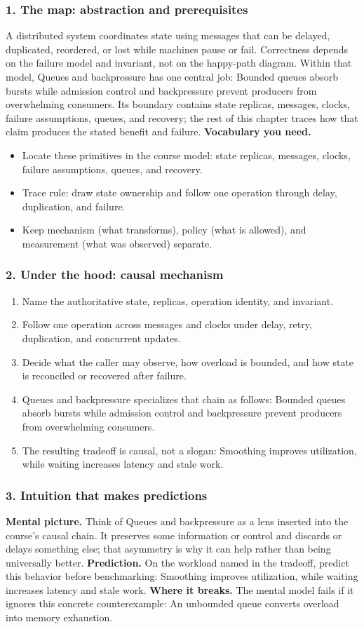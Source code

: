 \subsubsection*{1. The map: abstraction and prerequisites}
A distributed system coordinates state using messages that can be delayed, duplicated, reordered, or lost while machines pause or fail. Correctness depends on the failure model and invariant, not on the happy-path diagram.
Within that model, Queues and backpressure has one central job: Bounded queues absorb bursts while admission control and backpressure prevent producers from overwhelming consumers. Its boundary contains state replicas, messages, clocks, failure assumptions, queues, and recovery; the rest of this chapter traces how that claim produces the stated benefit and failure.
\textbf{Vocabulary you need.}\begin{itemize}
\item Locate these primitives in the course model: state replicas, messages, clocks, failure assumptions, queues, and recovery.
\item Trace rule: draw state ownership and follow one operation through delay, duplication, and failure.
\item Keep mechanism (what transforms), policy (what is allowed), and measurement (what was observed) separate.
\end{itemize}
\subsubsection*{2. Under the hood: causal mechanism}\begin{enumerate}
\item Name the authoritative state, replicas, operation identity, and invariant.
\item Follow one operation across messages and clocks under delay, retry, duplication, and concurrent updates.
\item Decide what the caller may observe, how overload is bounded, and how state is reconciled or recovered after failure.
\item Queues and backpressure specializes that chain as follows: Bounded queues absorb bursts while admission control and backpressure prevent producers from overwhelming consumers.
\item The resulting tradeoff is causal, not a slogan: Smoothing improves utilization, while waiting increases latency and stale work.
\end{enumerate}
\subsubsection*{3. Intuition that makes predictions}
\textbf{Mental picture.} Think of Queues and backpressure as a lens inserted into the course's causal chain. It preserves some information or control and discards or delays something else; that asymmetry is why it can help rather than being universally better.
\textbf{Prediction.} On the workload named in the tradeoff, predict this behavior before benchmarking: Smoothing improves utilization, while waiting increases latency and stale work.
\textbf{Where it breaks.} The mental model fails if it ignores this concrete counterexample: An unbounded queue converts overload into memory exhaustion.
